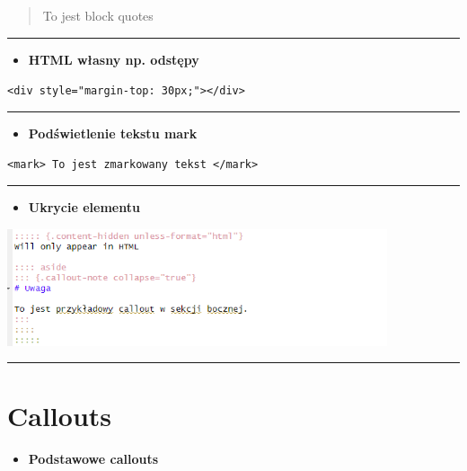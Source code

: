 \documentclass[
  a4paper,
  DIV=11,
  numbers=noendperiod,
  oneside,
  open=any]{scrreprt}
\providecommand{\tightlist}{%
  \setlength{\itemsep}{0pt}\setlength{\parskip}{0pt}}\usepackage{longtable,booktabs,array}
\begin{document}
\begin{quote}
To jest block quotes
\end{quote}

\begin{center}\rule{0.5\linewidth}{0.5pt}\end{center}

\begin{itemize}
\tightlist
\item
  \textbf{HTML własny np. odstępy}
\end{itemize}

\texttt{\textless{}div\ style="margin-top:\ 30px;"\textgreater{}\textless{}/div\textgreater{}}

\begin{center}\rule{0.5\linewidth}{0.5pt}\end{center}

\begin{itemize}
\tightlist
\item
  \textbf{Podświetlenie tekstu mark}
\end{itemize}

\texttt{\textless{}mark\textgreater{}\ To\ jest\ zmarkowany\ tekst\ \textless{}/mark\textgreater{}}

\begin{center}\rule{0.5\linewidth}{0.5pt}\end{center}

\begin{itemize}
\tightlist
\item
  \textbf{Ukrycie elementu}
\end{itemize}

\includegraphics[width=4.40625in,height=\textheight]{images/_format_hidden.png}

\begin{center}\rule{0.5\linewidth}{0.5pt}\end{center}

\section{Callouts}\label{callouts}

\begin{itemize}
\tightlist
\item
  \textbf{Podstawowe callouts}
\end{itemize}
\end{document}

